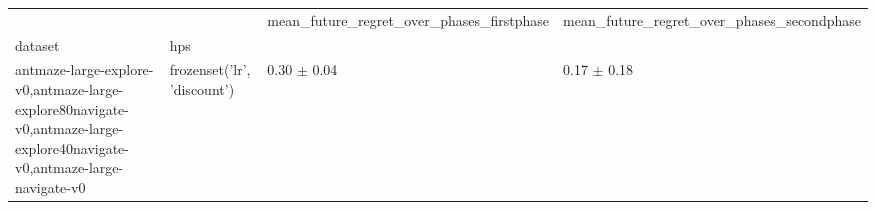 \begin{tabular}{llll}
\toprule
 &  & mean_future_regret_over_phases_firstphase & mean_future_regret_over_phases_secondphase \\
dataset & hps &  &  \\
\midrule
antmaze-large-explore-v0,antmaze-large-explore80navigate-v0,antmaze-large-explore40navigate-v0,antmaze-large-navigate-v0 & frozenset({'lr', 'discount'}) & 0.30 $\pm$ 0.04 & 0.17 $\pm$ 0.18 \\
\cline{1-4}
\bottomrule
\end{tabular}

